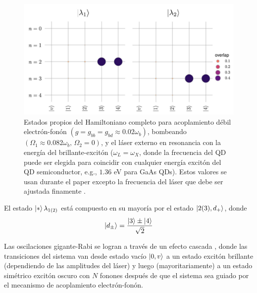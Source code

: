 \documentclass[main.tex]{subfiles}
\begin{document}
\begin{figure}[th]
	\centering
	\includegraphics[width=0.75\linewidth]{img/EigenstatesGiant-Rabi}
	\caption{Estados propios del Hamiltoniano completo para acoplamiento débil electrón-fonón $(g= g_{bb} = g_{bd} \approx 0.02\omega_b)$, bombeando $(\Omega_1 \approx 0.082\omega_b,\, \Omega_2=0)$, y el láser externo en resonancia con la energía del brillante-excitón ($\omega_L=\omega_X$, donde la frecuencia del QD puede ser elegida para coincidir con cualquier energía excitón del QD semiconductor, e.g., $1.36$ eV para GaAs QDs). Estos valores se usan durante el paper excepto la frecuencia del láser que debe ser ajustada finamente \parencite{Vargas2022}.}
	\label{fig:eigenstatesgiant-rabi}
\end{figure}

El estado $\ket{*}\lambda_{1(2)}$ está compuesto en su mayoría por el estado $\ket{2(3),d_+}$, donde
\begin{equation}
	\ket{d_\pm} = \frac{\ket{3} \pm \ket{4}}{\sqrt{2}}
\end{equation}

Las oscilaciones gigante-Rabi se logran a través de un efecto cascada \parencite{Bin2020}, donde las transiciones del sistema van desde estado vacío $\ket{0,v}$ a un estado excitón brillante (dependiendo de las amplitudes del láser) y luego (mayoritariamente) a un estado simétrico excitón oscuro con $N$ fonones después de que el sistema sea guiado por el mecanismo de acoplamiento electrón-fonón.
\end{document}
